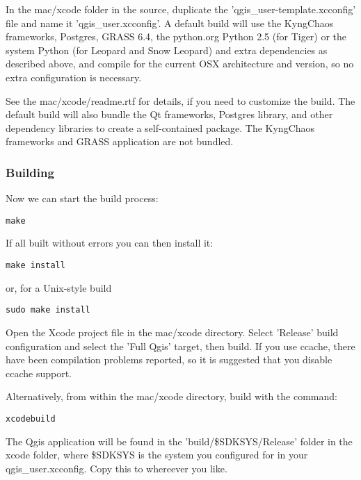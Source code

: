 \hypertarget{toc38}{}
In the mac/xcode folder in the source, duplicate the 'qgis\_user-template.xcconfig'
file and name it 'qgis\_user.xcconfig'. A default build will use the KyngChaos
frameworks, Postgres, GRASS 6.4, the python.org Python 2.5 (for Tiger)
or the system Python (for Leopard and Snow Leopard) and extra dependencies
as described above, and compile for the current OSX architecture and version, so no
extra configuration is necessary.

See the mac/xcode/readme.rtf for details, if you need to customize the build.
The default build will also bundle the Qt frameworks, Postgres library, and
other dependency libraries to create a self-contained package. The KyngChaos
frameworks and GRASS application are not bundled.

\hypertarget{toc39}{}
\subsubsection{Building}
\hypertarget{toc40}{}
Now we can start the build process:

\begin{verbatim}
make 
\end{verbatim}

If all built without errors you can then install it:

\begin{verbatim}
make install 
\end{verbatim}

or, for a Unix-style build

\begin{verbatim}
sudo make install
\end{verbatim}

\hypertarget{toc41}{}
Open the Xcode project file in the mac/xcode directory. Select 'Release' build
configuration and select the 'Full Qgis' target, then build. If you use ccache,
there have been compilation problems reported, so it is suggested that you disable
ccache support.

Alternatively, from within the mac/xcode directory, build with the command:

\begin{verbatim}
xcodebuild
\end{verbatim}

The Qgis application will be found in the 'build/\$SDKSYS/Release' folder
in the xcode folder, where \$SDKSYS is the system you configured for in your
qgis\_user.xcconfig. Copy this to whereever you like.


